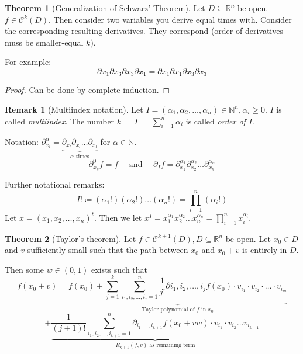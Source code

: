\documentclass[a4paper,landscape,twocolumn]{article}
\theoremstyle{definition}
\newtheorem{theorem}{Theorem}
\newtheorem{rem}{Remark}
\newcommand\abs[1]{\left|#1\right|}
\begin{document}
\begin{theorem}[Generalization of Schwarz' Theorem]
  Let $D \subseteq \mathbb R^n$ be open. $f \in \mathcal{C}^k(D)$.
  Then consider two variables you derive equal times with.
  Consider the corresponding resulting derivatives. They correspond
  (order of derivatives muss be smaller-equal $k$).

  For example:
  \[ \partial x_1 \partial x_3 \partial x_3 \partial x_1 = \partial x_1 \partial x_1 \partial x_3 \partial x_3 \]
\end{theorem}
\begin{proof}
  Can be done by complete induction.
\end{proof}

\begin{rem}[Multiindex notation]
  Let $I = (\alpha_1, \alpha_2, \ldots, \alpha_n) \in \mathbb N^n, \alpha_i \geq 0$.
  $I$ is called \emph{multiindex}. The number  $k = \abs{I} = \sum_{i=1}^n \alpha_i$
  is called \emph{order of $I$}.

  Notation: $\partial_{x_l}^\alpha = \underbrace{\partial_{x_l} \partial_{x_l} \ldots \partial_{x_l}}_{\alpha \text{ times}}$ for $\alpha \in \mathbb N$.
  \[ \partial_{x_k}^0 f = f \quad\text{ and }\quad \partial_I f = \partial_{x_1}^{\alpha_1} \partial_{x_2}^{\alpha_2} \ldots \partial_{x_n}^{\alpha_n} \]

  Further notational remarks:
  \[ I! \coloneqq (\alpha_1!) (\alpha_2!) \ldots (\alpha_n!) = \prod_{i=1}^n (\alpha_i!) \]
  Let $x = (x_1, x_2, \ldots, x_n)^t$.
  Then we let $x^I = x_1^{\alpha_1} x_2^{\alpha_2} \ldots x_n^{\alpha_n} = \prod_{i=1}^n x_i^{\alpha_i}$.
\end{rem}

\begin{theorem}[Taylor's theorem]
  Let $f \in \mathcal{C}^{k+1}(D), D \subseteq \mathbb R^n$ be open.
  Let $x_0 \in D$ and $v$ sufficiently small such that the path between $x_0$ and $x_0 + v$ is entirely in $D$.

  Then some $w \in (0,1)$ exists such that
  \[ f(x_0 + v) = \underbrace{f(x_0) + \sum_{j=1}^k \sum_{i_1, i_2, \ldots, i_j = 1}^n \frac{1}{j!} \partial i_1, i_2, \ldots, i_j f(x_0) \cdot v_{i_1} \cdot v_{i_2} \cdot \ldots \cdot v_{i_m}}_{\text{Taylor polynomial of $f$ in $x_0$}}
  \] \[
  + \underbrace{\frac{1}{(j+1)!} \sum_{i_1, i_2, \ldots, i_{k+1}=1}^n \partial_{i_1, \ldots, i_{k+1}} f(x_0 + vw) \cdot v_{i_1} \cdot v_{i_2} \ldots v_{i_{k+1}}}_{R_{k+1}(f,v) \text{ as remaining term}}
  \]
\end{theorem}
\end{document}
